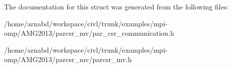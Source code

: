 The documentation for this struct was generated from the following files\+:\begin{DoxyCompactItemize}
\item 
/home/arnabd/workspace/civl/trunk/examples/mpi-\/omp/\+A\+M\+G2013/parcsr\+\_\+mv/par\+\_\+csr\+\_\+communication.\+h\item 
/home/arnabd/workspace/civl/trunk/examples/mpi-\/omp/\+A\+M\+G2013/parcsr\+\_\+mv/parcsr\+\_\+mv.\+h\end{DoxyCompactItemize}
